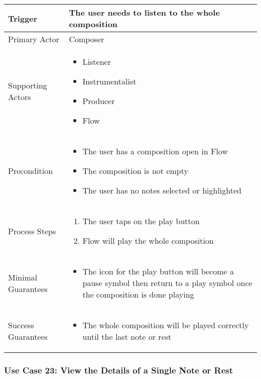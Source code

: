   \begin{tabularx}{\textwidth}{|X|X|}
  \hline
  Trigger & 
  The user needs to listen to the whole composition \\
  \hline
  Primary Actor & 
  Composer \\
  \hline
  Supporting Actors & 
  \begin{itemize}
  \item Listener
  \item Instrumentalist
  \item Producer
  \item Flow
  \end{itemize} \\
  \hline
  Precondition & 
  \begin{itemize}
  \item The user has a composition open in Flow
  \item The composition is not empty
  \item The user has no notes selected or highlighted
  \end{itemize} \\
  \hline
  Process Steps & 
  \begin{enumerate}
  \item The user taps on the play button
  \item Flow will play the whole composition
  \end{enumerate} \\
  \hline
  Minimal Guarantees & 
  \begin{itemize}
    \item The icon for the play button will become a pause symbol then return to a play symbol once the composition is done playing
  \end{itemize} \\
  \hline
  Success Guarantees & 
  \begin{itemize}
    \item The whole composition will be played correctly until the last note or rest
  \end{itemize} \\
  \hline
  \end{tabularx}

  \subsubsection{Use Case 23: View the Details of a Single Note or Rest}

